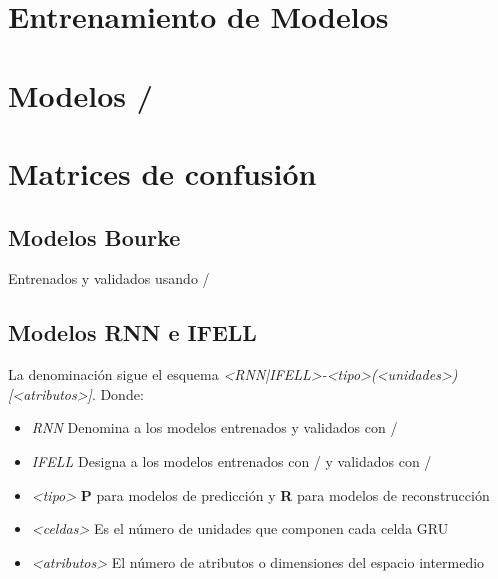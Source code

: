 


\section{Entrenamiento de Modelos}

\section{Modelos \ifell/}


\section{Matrices de confusión}

\subsection{Modelos Bourke}
Entrenados y validados usando \sisfall/

\subsection{Modelos RNN e IFELL}
La denominación sigue el esquema \textit{<RNN|IFELL>-<tipo>(<unidades>)[<atributos>]}. Donde:
\begin{itemize}
  \item \textit{RNN} Denomina a los modelos entrenados y validados con \sisfall/
  \item \textit{IFELL} Designa a los modelos entrenados con \accelcapture/ y validados con \sisfall/
  \item \textit{<tipo>} \textbf{P} para modelos de predicción y \textbf{R} para modelos de reconstrucción
  \item \textit{<celdas>} Es el número de unidades que componen cada celda GRU
  \item \textit{<atributos>} El número de atributos o dimensiones del espacio intermedio
\end{itemize}

